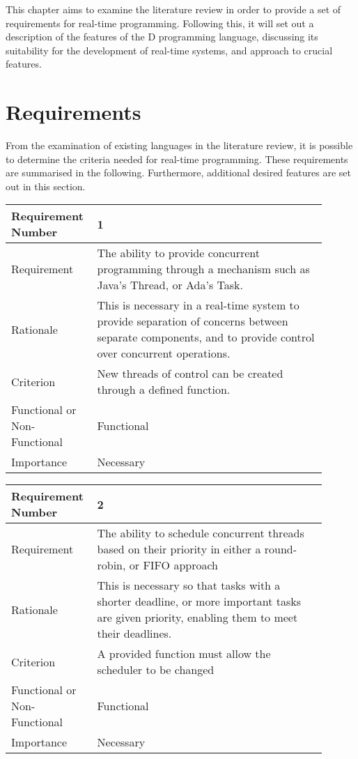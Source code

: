 
This chapter aims to examine the literature review in order to provide a set of 
requirements for real-time programming. Following this, it will set out a 
description of the features of the D programming language, discussing its 
suitability for the development of real-time systems, and approach to crucial 
features.

\section{Requirements}
From the examination of existing languages in the literature review, it is possible 
to determine the criteria needed for real-time programming. These requirements are 
summarised in the following. Furthermore, additional desired features are set out 
in this section. 
\begin{table}[!htbp]
\centering
\begin{tabular}{|L{0.2\linewidth}|L{0.7\linewidth}|}
\hline
Requirement Number & 1 \\ \hline
Requirement & The ability to provide concurrent programming through a 
mechanism such as Java's Thread, or Ada's Task. \\ \hline
Rationale      & This is necessary in a real-time system to provide separation 
of concerns between separate components, and to  provide control over 
concurrent operations. \\ \hline
Criterion      & New threads of control can be created through a defined 
function. \\ \hline
Functional or Non-Functional & Functional \\ \hline
Importance     & Necessary \\ \hline
\end{tabular}
\end{table}
\begin{table}[!htbp]
\centering
\begin{tabular}{|L{0.2\linewidth}|L{0.7\linewidth}|}
\hline
Requirement Number & 2 \\ \hline
Requirement & The ability to schedule concurrent threads based on their priority in 
                either a round-robin, or FIFO approach\\ \hline
Rationale      & This is necessary so that tasks with a shorter deadline, or more 
                important tasks are given priority, enabling them to meet their 
                deadlines. \\ \hline
Criterion      & A provided function must allow the scheduler to be changed \\ \hline
Functional or Non-Functional & Functional \\ \hline
Importance     & Necessary \\ \hline
\end{tabular}
\end{table}

